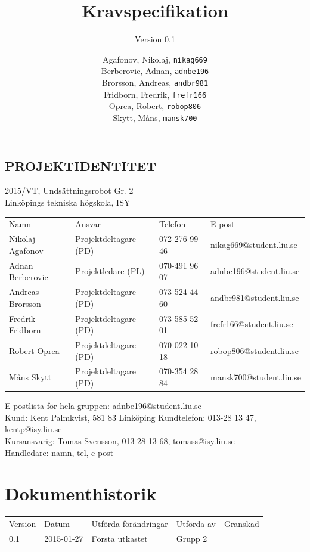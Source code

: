 \documentclass[11pt]{article}
\title{Kravspecifikation}
\subtitle{Version 0.1}
\author{
	Agafonov, Nikolaj, 
	\texttt{nikag669}
	\\
	Berberovic, Adnan, 
	\texttt{adnbe196}
	\\
	Brorsson, Andreas, 
	\texttt{andbr981}
	\\
	Fridborn, Fredrik, 
	\texttt{frefr166}
	\\
	Oprea, Robert, 
	\texttt{robop806}
	\\
	Skytt, Måns, 
	\texttt{mansk700}
}
\date{}
\begin{document}
\maketitle

\pagebreak
\begin{center}

\section*{PROJEKTIDENTITET}
2015/VT, Undsättningsrobot Gr. 2
\\
Linköpings tekniska högskola, ISY
\\[0.5in]
\begin{table}[h]
\begin{tabular}{llll}
Namn & Ansvar & Telefon & E-post \\[0.1in]
Nikolaj Agafonov & Projektdeltagare (PD) & 072-276 99 46 & nikag669@student.liu.se \\
Adnan Berberovic & Projektledare (PL) & 070-491 96 07 & adnbe196@student.liu.se \\
Andreas Brorsson & Projektdeltagare (PD) & 073-524 44 60 & andbr981@student.liu.se \\
Fredrik Fridborn & Projektdeltagare (PD) & 073-585 52 01 & frefr166@student.liu.se \\
Robert Oprea & Projektdeltagare (PD) & 070-022 10 18 & robop806@student.liu.se \\
Måns Skytt & Projektdeltagare (PD) & 070-354 28 84 & mansk700@student.liu.se
\end{tabular}
\end{table}

E-postlista för hela gruppen: adnbe196@student.liu.se
\\[1in]
Kund: Kent Palmkvist, 581 83 Linköping
Kundtelefon: 013-28 13 47, kentp@isy.liu.se
\\[1in]
Kursansvarig: Tomas Svensson, 013-28 13 68, tomass@isy.liu.se
\\
Handledare: namn, tel, e-post
\end{center}
\pagebreak

\tableofcontents

\pagebreak

\section*{Dokumenthistorik}
\begin{table}[h]
\begin{tabular}{lllll}

Version & Datum & Utförda förändringar & Utförda av & Granskad \\[0.1in]
0.1 & 2015-01-27 & Första utkastet & Grupp 2 &

\end{tabular}
\end{table}
\end{document}
